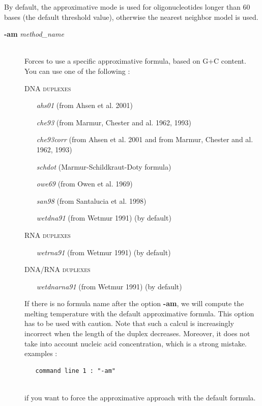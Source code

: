 \documentclass{article}
\begin{document}
By default, the approximative mode is used for oligonucleotides longer than 60 bases (the default threshold value), otherwise the nearest 
neighbor model is used. 
\begin{description}

\item [\textbf{-am} \textit{method\_name}]\mbox{}\\ 
  Forces to use a specific approximative formula, based on G+C content. You can use one of the following :
  
  \textsc{DNA duplexes}
    \begin{itemize}
    \item [\textit{ahs01}] (from Ahsen et al. 2001)
    \item [\textit{che93}] (from Marmur, Chester and al. 1962, 1993)
    \item [\textit{che93corr}] (from Ahsen et al. 2001 and from Marmur, Chester and al. 1962, 1993)
    \item [\textit{schdot}] (Marmur-Schildkraut-Doty formula)
    \item [\textit{owe69}] (from Owen et al. 1969)
    \item [\textit{san98}] (from Santalucia et al. 1998)
    \item [\textit{wetdna91}] (from Wetmur 1991)  (by default)
    \end{itemize}
  \textsc{RNA duplexes}
    \begin{itemize}
    \item [\textit{wetrna91}] (from Wetmur 1991)  (by default)
    \end{itemize}
  \textsc{DNA/RNA duplexes}
    \begin{itemize}
    \item [\textit{wetdnarna91}] (from Wetmur 1991)  (by default)
    \end{itemize}
  If there is no formula name after the option \textbf{-am}, we will compute the melting temperature with the default approximative formula.
  This option has to be used with caution. Note that such a calcul is increasingly incorrect when the length of  the duplex 
  decreases. Moreover, it does not take into account nucleic acid concentration, which is a strong mistake.
  examples :
  
  \begin{verbatim}
   command line 1 : "-am" 
  
  \end{verbatim}	  
  if you want to force the approximative approach with the 
  default formula.
  

\end{description}
\end{document}
